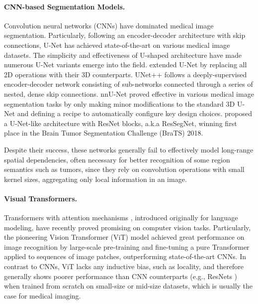 \documentclass[a4,12pt]{article}
\begin{document}
	\paragraph{CNN-based Segmentation Models.}
	
	Convolution neural networks (CNNs) have dominated medical image segmentation. Particularly, following an encoder-decoder architecture with skip connections, U-Net \citep{ronneberger2015u} has achieved state-of-the-art on various medical image datasets. The simplicity and effectiveness of U-shaped architecture have made numerous U-Net variants
	emerge into the field. \citet{cciccek20163d} extended U-Net by replacing all 2D operations with their 3D counterparts. UNet++ \citep{zhou2018unet++} follows a deeply-supervised encoder-decoder network consisting of sub-networks connected through a series of nested, dense skip connections. nnU-Net \citep{isensee2021nnu} proved effective in various medical image segmentation tasks by only making minor modifications to the standard 3D U-Net \citep{cciccek20163d} and defining a recipe to automatically configure key design choices. \citet{myronenko20183d} proposed a U-Net-like architecture with ResNet blocks, a.k.a ResSegNet, winning first place in the Brain Tumor Segmentation Challenge (BraTS) 2018.
	
	Despite their success, these networks generally fail to effectively model long-range spatial dependencies, often necessary for better recognition of some region semantics such as tumors, since they rely on convolution operations with small kernel sizes, aggregating only local information in an image.
	
	
	\paragraph{Visual Transformers.}
	Transformers with attention mechanisms \citep{vaswani2017attention}, introduced originally for language modeling, have recently proved promising on computer vision tasks. Particularly, the pioneering Vision Transformer (ViT) model \citep{dosovitskiy2020image} achieved great performance on image recognition by large-scale pre-training and fine-tuning a pure Transformer applied to sequences of image patches, outperforming state-of-the-art CNNs. In contrast to CNNs, ViT lacks any inductive bias, such as locality, and therefore generally shows poorer performance than CNN counterparts (e.g., ResNets \citep{he2016deep}) when trained from scratch on small-size or mid-size datasets, which is usually the case for medical imaging. 
	
\end{document}
